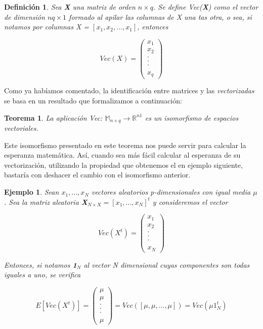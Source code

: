 \documentclass{article}
\theoremstyle{theorem-style}  %
\newtheorem{theorem}{Teorema}[section]  %
\theoremstyle{definition-style}
\newtheorem{definition}{Definición}[section]
\theoremstyle{example-style}
\newtheorem{example}{Ejemplo}[section]
\theoremstyle{exercise-style}
\begin{document}
\begin{definition}
Sea \textbf{X} una matriz de orden $n \times q$. Se define Vec(\textbf{X}) como el vector de dimensión $nq \times 1$ formado al apilar las columnas de X una tas otra, o sea, si notamos por columnas \textit{X} = $[x_1, x_2, ..., x_1]$, entonces

$$ Vec(X) = \left({\begin{array}{c}
	x_1\\
	x_2\\
	.\\
	.\\
	.\\
	\\
	x_q
	\end{array} } \right)$$
\end{definition}

Como ya habíamos comentado, la identificación entre matrices y las \textit{vectorizadas} se basa en un resultado que formalizamos a continuación:

\begin{theorem}
	\textit{La aplicación Vec: $\mathbb{M}_{n \times q} \rightarrow \mathbb{R}^{n1}$ es un isomorfismo de espacios vectoriales.}
\end{theorem}


Este isomorfismo presentado en este teorema nos puede servir para calcular la esperanza matemática. 
Así, cuando sea más fácil calcular al esperanza de su vectorización, utilizando la propiedad que obtenemos el en ejemplo siguiente, bastaría con deshacer el cambio con el isomorfismo anterior.


\begin{example}
	Sean $x_1, ... , x_N$  vectores aleatorios p-dimensionales con igual media $\mu$. Sea la matriz aleatoria \textbf{X}$_{N \times X } = [x_1, ..., x_N]^t$ y consideremos el vector
	
	$$ Vec(X^t) = \left({\begin{array}{c}
		x_1\\
		x_2\\
		.\\
		.\\
		.\\
		\\
		x_N
		\end{array} } \right)$$
	
	Entonces, si notamos \textbf{1}$_N$ al vector N dimensional cuyas componentes son todas iguales a uno, se verifica
	
	$$ E[Vec(X^t)] = \left({\begin{array}{c}
		\mu\\
		\mu\\
		.\\
		.\\
		.\\
		\\
		\mu
		\end{array} } \right) = Vec([\mu, \mu, ..., \mu]) = Vec(\mu 1_N^t)$$
\end{example}
\end{document}
